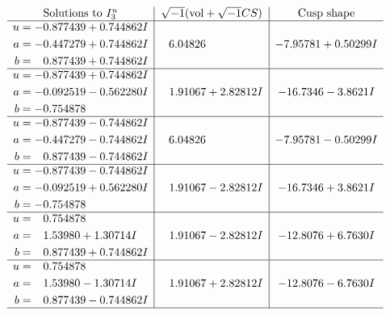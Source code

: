 \documentclass[1p]{elsarticle_modified}
\theoremstyle{definition}
\newcommand{\I}{\sqrt{-1}}
\begin{document}
$$\begin{array}{c|c|c}  
\text{Solutions to }I^u_{3}& \I (\text{vol} + \sqrt{-1}CS) & \text{Cusp shape}\\
 \hline 
\begin{aligned}
u &= -0.877439 + 0.744862 I \\
a &= -0.447279 + 0.744862 I \\
b &= \phantom{-}0.877439 + 0.744862 I\end{aligned}
 & \phantom{-}6.04826\phantom{ +0.000000I} & -7.95781 + 0.50299 I \\ \hline\begin{aligned}
u &= -0.877439 + 0.744862 I \\
a &= -0.092519 - 0.562280 I \\
b &= -0.754878\phantom{ +0.000000I}\end{aligned}
 & \phantom{-}1.91067 + 2.82812 I & -16.7346 - 3.8621 I \\ \hline\begin{aligned}
u &= -0.877439 - 0.744862 I \\
a &= -0.447279 - 0.744862 I \\
b &= \phantom{-}0.877439 - 0.744862 I\end{aligned}
 & \phantom{-}6.04826\phantom{ +0.000000I} & -7.95781 - 0.50299 I \\ \hline\begin{aligned}
u &= -0.877439 - 0.744862 I \\
a &= -0.092519 + 0.562280 I \\
b &= -0.754878\phantom{ +0.000000I}\end{aligned}
 & \phantom{-}1.91067 - 2.82812 I & -16.7346 + 3.8621 I \\ \hline\begin{aligned}
u &= \phantom{-}0.754878\phantom{ +0.000000I} \\
a &= \phantom{-}1.53980 + 1.30714 I \\
b &= \phantom{-}0.877439 + 0.744862 I\end{aligned}
 & \phantom{-}1.91067 - 2.82812 I & -12.8076 + 6.7630 I \\ \hline\begin{aligned}
u &= \phantom{-}0.754878\phantom{ +0.000000I} \\
a &= \phantom{-}1.53980 - 1.30714 I \\
b &= \phantom{-}0.877439 - 0.744862 I\end{aligned}
 & \phantom{-}1.91067 + 2.82812 I & -12.8076 - 6.7630 I\\
 \hline 
 \end{array}$$\newpage
\end{document}
